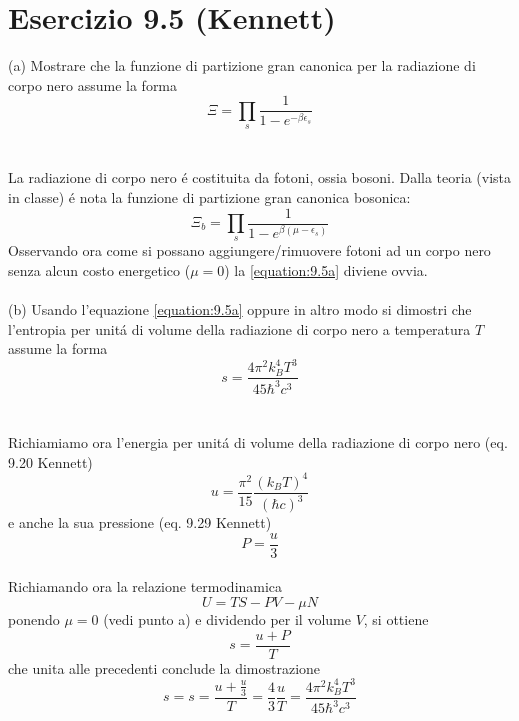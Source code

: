 \documentclass[a4paper]{article}
\begin{document}
    \section*{Esercizio 9.5 (Kennett)}
        (a) Mostrare che la funzione di partizione gran canonica per la radiazione di corpo nero assume la forma
        \begin{equation}
            \Xi=\prod_s\frac{1}{1-e^{-\beta\epsilon_s}}
            \label{equation:9.5a}
        \end{equation}
        \\
        \\
        La radiazione di corpo nero \'e costituita da fotoni, ossia bosoni.
        Dalla teoria (vista in classe) \'e nota la funzione di partizione gran canonica bosonica:
        \begin{equation*}
            \Xi_b=\prod_s\frac{1}{1-e^{\beta(\mu-\epsilon_s)}}
        \end{equation*}
        Osservando ora come si possano aggiungere/rimuovere fotoni ad un corpo nero senza alcun costo energetico ($\mu=0$) la \ref{equation:9.5a} diviene ovvia.
        \\
        \\
        (b) Usando l'equazione \ref{equation:9.5a} oppure in altro modo si dimostri che l'entropia per unit\'a di volume della radiazione di corpo nero a temperatura $T$ assume la forma
        \begin{equation}
            s=\frac{4\pi^2k_B^4T^3}{45\hbar^3c^3}
        \end{equation}
        \\
        \\
        Richiamiamo ora l'energia per unit\'a di volume della radiazione di corpo nero (eq. 9.20 Kennett)
        \begin{equation*}
            u=\frac{\pi^2}{15}\frac{(k_BT)^4}{(\hbar c)^3}
        \end{equation*}
        e anche la sua pressione (eq. 9.29 Kennett)
        \begin{equation*}
            P=\frac{u}{3}
        \end{equation*}
        \\
        Richiamando ora la relazione termodinamica
        \begin{equation}
            U=TS-PV-\mu N
        \end{equation}
        ponendo $\mu=0$ (vedi punto a) e dividendo per il volume $V$, si ottiene
        \begin{equation*}
            s=\frac{u+P}{T}
        \end{equation*}
        che unita alle precedenti conclude la dimostrazione
        \begin{equation*}
            s=s=\frac{u+\frac{u}{3}}{T}=\frac{4}{3}\frac{u}{T}=\frac{4\pi^2k_B^4T^3}{45\hbar^3c^3}
        \end{equation*}
\end{document}
